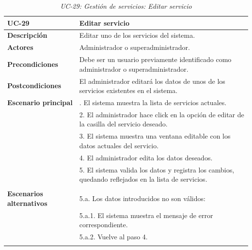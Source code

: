 \begin{table}
  \begin{center}
    \begin{tabularx}{16.4cm}{|l|X|}
      \hline
      \textbf{UC-29} & \textbf{Editar servicio}\\
      \hline
      \textbf{Descripción} & Editar uno de los servicios del sistema.\\
      \hline
      \textbf{Actores} & Administrador o superadministrador.\\
      \hline
      \textbf{Precondiciones} & Debe ser un usuario previamente identificado como administrador o superadministrador.\\
      \hline
      \textbf{Postcondiciones} & El administrador editará los datos de unos de los servicios existentes en el sistema.\\
      \hline
      \textbf{Escenario principal} & \smallskip 1. El sistema muestra la lista de servicios actuales.\\
      & 2. El administrador hace click en la opción de editar de la casilla del servicio deseado.\\
      & 3. El sistema muestra una ventana editable con los datos actuales del servicio.\\
      & 4. El administrador edita los datos deseados.\\
      & 5. El sistema valida los datos y registra los cambios, quedando reflejados en la lista de servicios.\\
      & \\
      \hline
      \textbf{Escenarios alternativos} & \smallskip 5.a. Los datos introducidos no son válidos:\\
      & \hspace{0.3cm} 5.a.1. El sistema muestra el mensaje de error correspondiente.\\
      & \hspace{0.3cm} 5.a.2. Vuelve al paso 4.\\
      & \\
      \hline
    \end{tabularx}
    \caption{\textit{UC-29: Gestión de servicios: Editar servicio}}
    \label{tab:CU-editar-servicio}
  \end{center}
\end{table}


